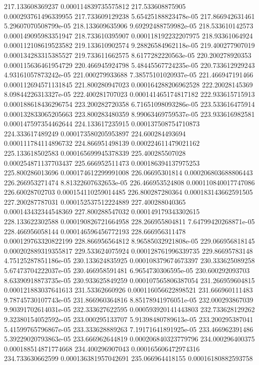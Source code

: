 {217.133608369237 0.000114839735575812
217.533608875905 0.000293761496339955
217.733609129238 5.65425188823478e-05
217.866942631461 5.29607070508799e-05
218.133609635906 9.69292488759982e-05
218.533610142573 0.000149095983351947
218.733610395907 0.000118192232207975
218.93361064924 0.000112108619523582
219.133610902574 9.28826584962118e-05
219.400277907019 0.000134283315385527
219.733611662575 8.6177282220563e-05
220.200278920353 0.000115636461954729
220.466945924798 5.48445567724235e-05
220.733612929243 4.93161057873242e-05
221.000279933688 7.38575101020937e-05
221.466947191466 0.000112694571131845
221.800280947023 0.000164288206962528
222.20028145369 8.09844226313327e-05
222.400281707023 0.000141465174817182
222.933615715913 0.000188618436296754
223.200282720358 6.71651098093286e-05
223.533616475914 0.000132833065205663
223.800283480359 8.99063469759537e-05
223.933616982581 0.000147597354462644
224.133617235915 0.000137508754710873
224.333617489249 0.000173580205953897
224.600284493694 0.000111784114896732
224.866951498139 0.000224611479021162
225.133618502583 0.000165699945378339
225.400285507028 0.000254871137703437
225.666952511473 0.000186394137975253
225.800286013696 0.000174612299991008
226.06695301814 0.000206803688806443
226.266953271474 8.81322607632653e-05
226.466953524808 0.000110840017747086
226.60028702703 0.000154110259014485
226.800287280364 0.000183143662591505
227.200287787031 0.000152537512224889
227.400288040365 0.000143432344548369
227.800288547032 0.000149179343302615
228.133622302588 0.000190826721664958
228.266955804811 7.64799420268871e-05
228.466956058144 0.000146596456772193
228.666956311478 0.000129763320822199
228.866956564812 8.96585032921808e-05
229.066956818145 0.000202889319355817
229.533624075924 0.000128761996339735
229.86695783148 4.75125287851186e-05
230.133624835925 0.000108379674673397
230.333625089258 5.67473704222037e-05
230.466958591481 6.9654730306595e-05
230.600292093703 8.63390918873735e-05
230.933625849259 0.000107565806387054
231.266959604815 0.000121883037641613
231.53362660926 0.000116056622898521
231.666960111483 9.78745730107743e-05
231.866960364816 8.85178941976051e-05
232.000293867039 9.90391702614031e-05
232.333627622595 0.000593920141443803
232.733628129262 9.32380154052592e-05
233.000295133707 5.91398480789613e-05
233.200295387041 5.41599765796867e-05
233.333628889263 7.19171641891925e-05
233.466962391486 5.39229020793863e-05
233.666962644819 0.000206840323779796
234.000296400375 0.000188514871774668
234.400296907043 0.000165606472974316
234.733630662599 0.000136381957042691
235.066964418155 0.00016180882593758
}

